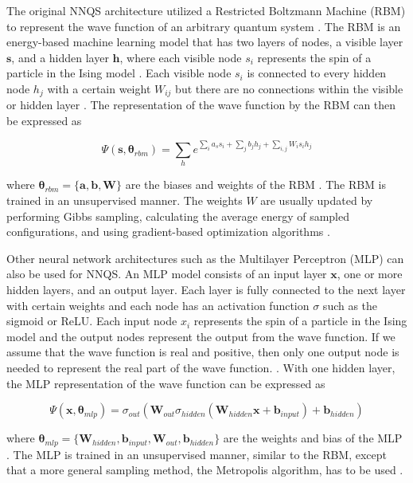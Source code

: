 The original NNQS architecture utilized a Restricted Boltzmann Machine (RBM) to represent the wave function of an arbitrary quantum system \cite{b20}. The RBM is an energy-based machine learning model that has two layers of nodes, a visible layer $\boldsymbol{s}$, and a hidden layer $\boldsymbol{h}$, where each visible node $s_i$ represents the spin of a particle in the Ising model \cite{b20}. Each visible node $s_i$ is connected to every hidden node $h_j$ with a certain weight $W_{ij}$ but there are no connections within the visible or hidden layer \cite{b20}. The representation of the wave function by the RBM can then be expressed as

\begin{equation}
    \Psi(\boldsymbol{s}, \boldsymbol{\theta}_{rbm}) = \sum_{h} e^{\sum_i a_s s_i + \sum_j b_j h_j + \sum_{i,j}W_i s_i h_j} 
\end{equation}

where  $\boldsymbol{\theta}_{rbm} = \{\boldsymbol{a}, \boldsymbol{b}, \boldsymbol{W}\}$ are the biases and weights of the RBM \cite{b20}. The RBM is trained in an unsupervised manner. The weights $W$ are usually updated by performing Gibbs sampling, calculating the average energy of sampled configurations, and using gradient-based optimization algorithms \cite{b25}.

Other neural network architectures such as the Multilayer Perceptron (MLP) can also be used for NNQS. An MLP model consists of an input layer $\boldsymbol{x}$, one or more hidden layers, and an output layer. Each layer is fully connected to the next layer with certain weights and each node has an activation function $\sigma$ such as the sigmoid or ReLU. Each input node $x_i$ represents the spin of a particle in the Ising model and the output nodes represent the output from the wave function. If we assume that the wave function is real and positive, then only one output node is needed to represent the real part of the wave function. \cite{b20}. With one hidden layer, the MLP representation of the wave function can be expressed as

\begin{equation}
    \Psi(\boldsymbol{x}, \boldsymbol{\theta}_{mlp}) = 
    \sigma_{out} \left(
    \boldsymbol{W}_{out}
    \sigma_{hidden} \left( \boldsymbol{W}_{hidden}\boldsymbol{x} + \boldsymbol{b}_{input} \right) + \boldsymbol{b}_{hidden} \right)
\end{equation}

where  $\boldsymbol{\theta}_{mlp} = \{\boldsymbol{W}_{hidden}, \boldsymbol{b}_{input}, \boldsymbol{W}_{out}, \boldsymbol{b}_{hidden}\}$ are the weights and bias of the MLP \cite{b20}. The MLP is trained in an unsupervised manner, similar to the RBM, except that a more general sampling method, the Metropolis algorithm, has to be used \cite{b25}.

